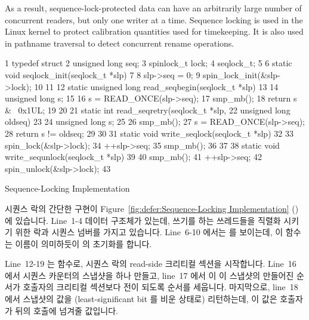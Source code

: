 As a result, sequence-lock-protected data can have an arbitrarily
large number of concurrent readers, but only one writer at a time.
Sequence locking is used in the Linux kernel to protect calibration
quantities used for timekeeping.
It is also used in pathname traversal to detect concurrent rename operations.
\fi

\begin{listing}[tb]
{ \scriptsize
\begin{verbbox}
 1  typedef struct {
 2    unsigned long seq;
 3    spinlock_t lock;
 4  } seqlock_t;
 5
 6  static void seqlock_init(seqlock_t *slp)
 7  {
 8    slp->seq = 0;
 9    spin_lock_init(&slp->lock);
10  }
11
12  static unsigned long read_seqbegin(seqlock_t *slp)
13  {
14    unsigned long s;
15
16    s = READ_ONCE(slp->seq);
17    smp_mb();
18    return s & ~0x1UL;
19  }
20
21  static int read_seqretry(seqlock_t *slp,
22                           unsigned long oldseq)
23  {
24    unsigned long s;
25
26    smp_mb();
27    s = READ_ONCE(slp->seq);
28    return s != oldseq;
29  }
30
31  static void write_seqlock(seqlock_t *slp)
32  {
33    spin_lock(&slp->lock);
34    ++slp->seq;
35    smp_mb();
36  }
37
38  static void write_sequnlock(seqlock_t *slp)
39  {
40    smp_mb();
41    ++slp->seq;
42    spin_unlock(&slp->lock);
43  }
\end{verbbox}
}
\centering
\theverbbox
\caption{Sequence-Locking Implementation}
\label{lst:defer:Sequence-Locking Implementation}
\end{listing}

시퀀스 락의 간단한 구현이
Figure~\ref{fig:defer:Sequence-Locking Implementation}
() 에 있습니다.
Line~1-4 데이터 구조체가 있는데, 쓰기를 하는 쓰레드들을 직렬화
시키기 위한 락과 시퀀스 넘버를 가지고 있습니다.
Line~6-10 에서는  를 보이는데, 이 함수는 이름이 의미하듯이
 의 초기화를 합니다.

Line~12-19 는  함수로, 시퀀스 락의 read-side 크리티컬
섹션을 시작합니다.
Line~16 에서 시퀀스 카운터의 스냅샷을 하나 만들고, line~17 에서 이 이 스냅샷의
만들어진 순서가 호출자의 크리티컬 섹션보다 전이 되도록 순서를 세웁니다.
마지막으로, line~18 에서 스냅샷의 값을 (least-significant bit 를 비운 상태로)
리턴하는데, 이 값은 호출자가 뒤의  호출에 넘겨줄 값입니다.
\iffalse

